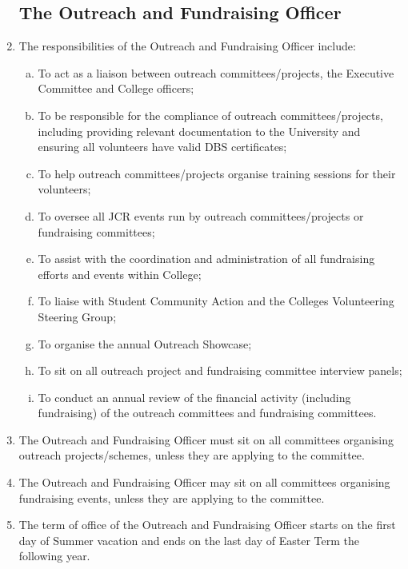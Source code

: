 \documentclass[12pt]{article}
\begin{document}
\begin{enumerate}
    \subsection{The Outreach and Fundraising Officer}
    \item The responsibilities of the Outreach and Fundraising Officer include:
    \begin{enumerate}[(a)]
        \item To act as a liaison between outreach committees/projects, the Executive Committee and College officers;
        \item To be responsible for the compliance of outreach committees/projects, including providing relevant documentation to the University and ensuring all volunteers have valid DBS certificates;
        \item To help outreach committees/projects organise training sessions for their volunteers;
        \item To oversee all JCR events run by outreach committees/projects or fundraising committees;
        \item To assist with the coordination and administration of all fundraising efforts and events within College;
        \item To liaise with Student Community Action and the Colleges Volunteering Steering Group;
        \item To organise the annual Outreach Showcase;
        \item To sit on all outreach project and fundraising committee interview panels;
        \item To conduct an annual review of the financial activity (including fundraising) of the outreach committees and fundraising committees.
    \end{enumerate}
    \item The Outreach and Fundraising Officer must sit on all committees organising outreach projects/schemes, unless they are applying to the committee.
    \item The Outreach and Fundraising Officer may sit on all committees organising fundraising events, unless they are applying to the committee.
    \item The term of office of the Outreach and Fundraising Officer starts on the first day of Summer vacation and ends on the last day of Easter Term the following year.

\end{enumerate}
\end{document}
